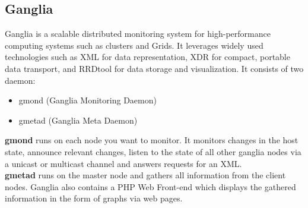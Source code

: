 \documentclass[12pt]{book}
\begin{document}
\subsection{Ganglia}
Ganglia is a scalable distributed monitoring system for high-performance computing systems such as clusters and Grids.
It leverages widely used technologies such as XML for data representation, XDR for compact, 
portable data transport, and RRDtool for data storage and visualization.
It consists of two daemon:
\begin{itemize}
 \item gmond (Ganglia Monitoring Daemon)
 \item gmetad (Ganglia Meta Daemon)
 \end{itemize}
\textbf{gmond} runs on each node you want to monitor. It monitors changes in the host state,
announce relevant changes, listen to the state of all other ganglia nodes via a unicast or
multicast channel and answers requests for an XML.\\
\textbf{gmetad} runs on the master node and gathers all information from the client nodes.
Ganglia also contains a PHP Web Front-end which displays the gathered information in
the form of graphs via web pages.
\\\noindent
\end{document}
